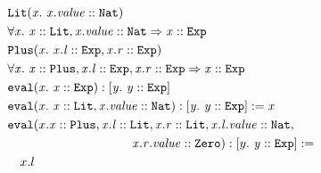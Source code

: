\begin{align*}
&\constr{\texttt{Lit}}{x}{\instOf{x.value}{\texttt{Nat}}}\\
&\progEnt{x}{\instOf{x}{\texttt{Lit}}, \instOf{x.value}{\texttt{Nat}}}{\instOf{x}{\texttt{Exp}}}\\
&\constr{\texttt{Plus}}{x}{\instOf{x.l}{\texttt{Exp}}, \instOf{x.r}{\texttt{Exp}}}\\
&\progEnt{x}{\instOf{x}{\texttt{Plus}}, \instOf{x.l}{\texttt{Exp}}, \instOf{x.r}{\texttt{Exp}}}{\instOf{x}{\texttt{Exp}}}\\
&\mDecl{\texttt{eval}}{x}{\instOf{x}{\texttt{Exp}}}{\type{y}{\instOf{y}{\texttt{Exp}}}}\\
&\mImpl{\texttt{eval}}
       {x}
       {\instOf{x}{\texttt{Lit}}, \instOf{x.value}{\texttt{Nat}}}
       {\type{y}{\instOf{y}{\texttt{Exp}}}}
       {x}\\
&\texttt{eval}(x. \instOf{x}{\texttt{Plus}},
                  \instOf{x.l}{\texttt{Lit}},
                  \instOf{x.r}{\texttt{Lit}},
                  \instOf{x.l.value}{\texttt{Nat}},\\
&\qquad\qquad\qquad\qquad\qquad
                  \instOf{x.r.value}{\texttt{Zero}} )
    : \type{y}{\instOf{y}{\texttt{Exp}}} := \\
&\quad x.l\\

\end{align*}
